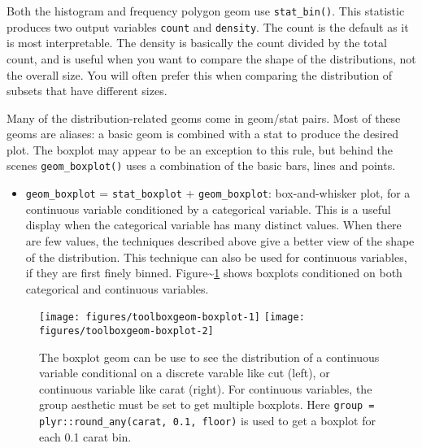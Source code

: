 \noindent Both the histogram and frequency polygon geom use
\texttt{stat\_bin()}. This statistic produces two output variables
\texttt{count} and \texttt{density}. The count is the default as it is
most interpretable. The density is basically the count divided by the
total count, and is useful when you want to compare the shape of the
distributions, not the overall size. You will often prefer this when
comparing the distribution of subsets that have different sizes.

Many of the distribution-related geoms come in geom/stat pairs. Most of
these geoms are aliases: a basic geom is combined with a stat to produce
the desired plot. The boxplot may appear to be an exception to this
rule, but behind the scenes \texttt{geom\_boxplot()} uses a combination
of the basic bars, lines and points.

\begin{itemize}
\itemsep1pt\parskip0pt
\item
  \texttt{geom\_boxplot} = \texttt{stat\_boxplot} +
  \texttt{geom\_boxplot}: box-and-whisker plot, for a continuous
  variable conditioned by a categorical variable. This is a useful
  display when the categorical variable has many distinct values. When
  there are few values, the techniques described above give a better
  view of the shape of the distribution. This technique can also be used
  for continuous variables, if they are first finely binned.
  Figure\textasciitilde{}\ref{fig:geom-boxplot} shows boxplots
  conditioned on both categorical and continuous variables.
    
\end{itemize}

\begin{Shaded}
\begin{Highlighting}[]
\NormalTok{)}
\NormalTok{, }
        \NormalTok{(}\NormalTok{, }\NormalTok{))}
\end{Highlighting}
\end{Shaded}

\begin{figure}
\texttt{[image: figures/toolboxgeom-boxplot-1]} \texttt{[image: figures/toolboxgeom-boxplot-2]} \caption{The boxplot geom can be use to see the distribution of a continuous variable conditional on a discrete varable like cut (left), or continuous variable like carat (right). For continuous variables, the group aesthetic must be set to get multiple boxplots. Here \texttt{group = plyr::round\_any(carat, 0.1, floor)} is used to get a boxplot for each 0.1 carat bin.\label{fig:geom-boxplot}}
\end{figure}

